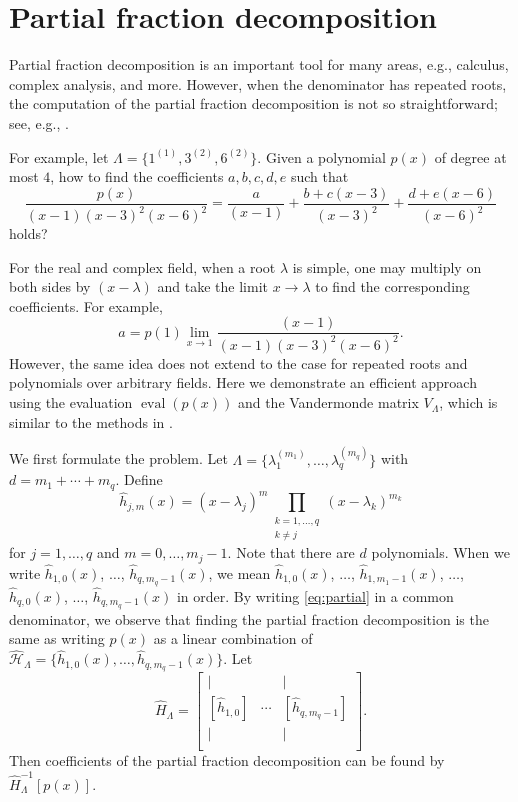 \documentclass{article}
\theoremstyle{definition}
\newcommand{\eval}{\operatorname{eval}}
\begin{document}
\section{Partial fraction decomposition}

Partial fraction decomposition is an important tool for many areas, e.g., calculus, complex analysis, and more.  However, when the denominator has repeated roots, the computation of the partial fraction decomposition is not so straightforward; see, e.g., \cite{MS83}.  

For example, let $\Lambda = \{1^{(1)},3^{(2)},6^{(2)}\}$.  Given a polynomial $p(x)$ of degree at most $4$, how to find the coefficients $a,b,c,d,e$ such that  
\begin{equation}
\label{eq:partial}
    \frac{p(x)}{(x-1)(x-3)^2(x-6)^2} = \frac{a}{(x-1)} + \frac{b + c(x-3)}{(x-3)^2} + \frac{d + e(x-6)}{(x-6)^2}
\end{equation}
holds?

For the real and complex field, when a root $\lambda$ is simple, one may multiply on both sides by $(x-\lambda)$ and take the limit $x\rightarrow \lambda$ to find the corresponding coefficients.  For example, 
\[
    a = p(1) \lim_{x\rightarrow 1} \frac{(x - 1)}{(x-1)(x-3)^2(x-6)^2}.
\]
However, the same idea does not extend to the case for repeated roots and polynomials over arbitrary fields.  Here we demonstrate an efficient approach using the evaluation $\eval(p(x))$ and the Vandermonde matrix $V_\Lambda$, which is similar to the methods in \cite{MS83}.   

We first formulate the problem.  Let $\Lambda = \{\lambda_1^{(m_1)}, \ldots, \lambda_q^{(m_q)}\}$ with $d = m_1 + \cdots + m_q$.  Define 
\[
    \hat{h}_{j,m}(x) = (x - \lambda_j)^m \prod_{\substack{k = 1, \ldots, q\\ k\neq j}}
    (x - \lambda_k)^{m_k}
\]
for $j = 1, \ldots, q$ and $m = 0, \ldots, m_j - 1$. Note that there are $d$ polynomials. 
When we write $\hat{h}_{1,0}(x)$, $\ldots$, $\hat{h}_{q,m_q-1}(x)$, we mean $\hat{h}_{1,0}(x)$, $\ldots$, $\hat{h}_{1,m_1-1}(x)$, 
$\ldots$, $\hat{h}_{q,0}(x)$, $\ldots$, $\hat{h}_{q,m_q-1}(x)$ in order.  By writing \cref{eq:partial} in a common denominator, we observe that finding the partial fraction decomposition is the same as writing $p(x)$ as a linear combination of $\hat{\mathcal{H}}_\Lambda 
= \{\hat{h}_{1,0}(x), \ldots, \hat{h}_{q,m_q-1}(x)\}$.  Let 
\[
    \hat{H}_\Lambda = \begin{bmatrix}
        | & ~ & | \\
        [\hat{h}_{1,0}] & \cdots & [\hat{h}_{q,m_q-1}] \\
        | & ~ & | \\
    \end{bmatrix}.
\]
Then coefficients of the partial fraction decomposition can be found by $\hat{H}_\Lambda^{-1}[p(x)]$.  
\end{document}
